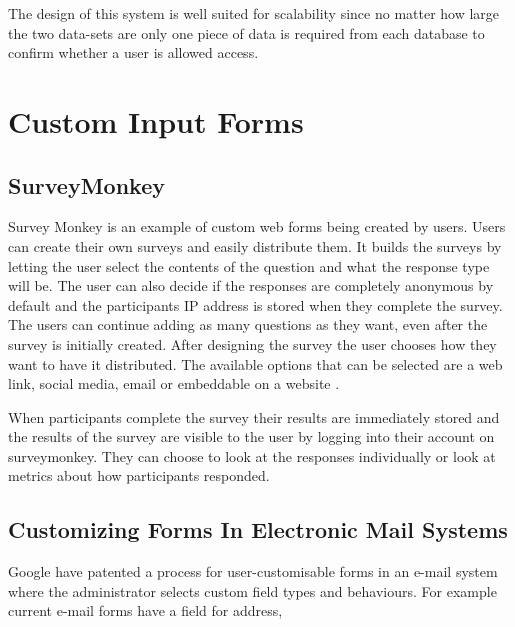 \documentclass[11pt]{report}
\begin{document}
The design of this system is well suited for scalability since no matter how large the two data-sets are only one piece of data is required from each database to confirm whether a user is allowed access.


\section{Custom Input Forms}

\subsection{SurveyMonkey}
Survey Monkey \cite{finley_surveymonkey_1999-1} is an example of custom web forms being created by users. Users can create their own surveys and easily distribute them. It builds the surveys by letting the user select the contents of the question and what the response type will be. The user can also decide if the responses are completely anonymous by default and the participants IP address is stored when they complete the survey. The users can continue adding as many questions as they want, even after the survey is initially created. After designing the survey the user chooses how they want to have it distributed. The available options that can be selected are a web link, social media, email or embeddable on a website \cite{waclawski_how_2012-1}.

When participants complete the survey their results are immediately stored and the results of the survey are visible to the user by logging into their account on surveymonkey. They can choose to look at the responses individually or look at metrics about how participants responded.


\subsection{Customizing Forms In Electronic Mail Systems}
\noindent
Google have patented \cite{holt_customizing_2006-1} a process for user-customisable forms in an e-mail system where the administrator selects custom field types and behaviours.  For example current e-mail forms have a field for address,
\end{document}
